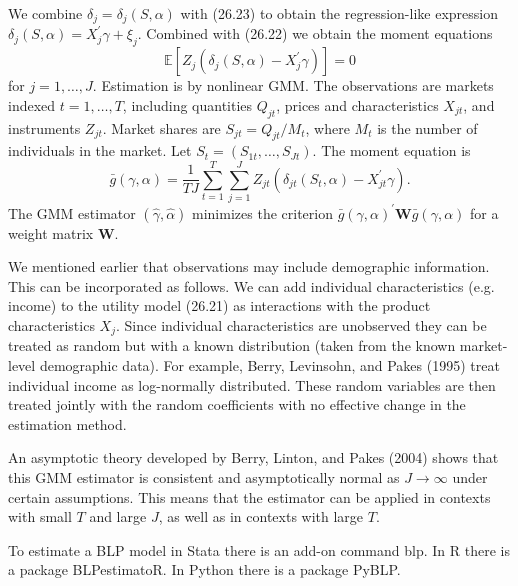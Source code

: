 \documentclass[10pt]{article}
\begin{document}
We combine $\delta_{j}=\delta_{j}(S, \alpha)$ with (26.23) to obtain the regression-like expression $\delta_{j}(S, \alpha)=X_{j}^{\prime} \gamma+\xi_{j}$. Combined with (26.22) we obtain the moment equations
$$
\mathbb{E}\left[Z_{j}\left(\delta_{j}(S, \alpha)-X_{j}^{\prime} \gamma\right)\right]=0
$$
for $j=1, \ldots, J$. Estimation is by nonlinear GMM. The observations are markets indexed $t=1, \ldots, T$, including quantities $Q_{j t}$, prices and characteristics $X_{j t}$, and instruments $Z_{j t}$. Market shares are $S_{j t}=Q_{j t} / M_{t}$, where $M_{t}$ is the number of individuals in the market. Let $S_{t}=\left(S_{1 t}, \ldots, S_{J t}\right)$. The moment equation is
$$
\bar{g}(\gamma, \alpha)=\frac{1}{T J} \sum_{t=1}^{T} \sum_{j=1}^{J} Z_{j t}\left(\delta_{j t}\left(S_{t}, \alpha\right)-X_{j t}^{\prime} \gamma\right) .
$$
The GMM estimator $(\widehat{\gamma}, \widehat{\alpha})$ minimizes the criterion $\bar{g}(\gamma, \alpha)^{\prime} \boldsymbol{W} \bar{g}(\gamma, \alpha)$ for a weight matrix $\boldsymbol{W}$.

We mentioned earlier that observations may include demographic information. This can be incorporated as follows. We can add individual characteristics (e.g. income) to the utility model (26.21) as interactions with the product characteristics $X_{j}$. Since individual characteristics are unobserved they can be treated as random but with a known distribution (taken from the known market-level demographic data). For example, Berry, Levinsohn, and Pakes (1995) treat individual income as log-normally distributed. These random variables are then treated jointly with the random coefficients with no effective change in the estimation method.

An asymptotic theory developed by Berry, Linton, and Pakes (2004) shows that this GMM estimator is consistent and asymptotically normal as $J \rightarrow \infty$ under certain assumptions. This means that the estimator can be applied in contexts with small $T$ and large $J$, as well as in contexts with large $T$.

To estimate a BLP model in Stata there is an add-on command blp. In R there is a package BLPestimatoR. In Python there is a package PyBLP.
\end{document}
